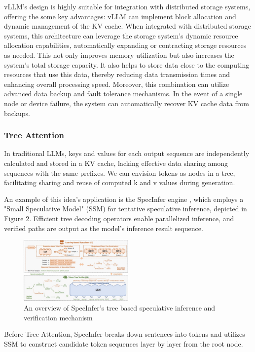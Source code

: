 \documentclass[conference]{IEEEtran}
\begin{document}
vLLM's design is highly suitable for integration with distributed storage systems, offering the some key advantages: vLLM can implement block allocation and dynamic management of the KV cache. When integrated with distributed storage systems, this architecture can leverage the storage system's dynamic resource allocation capabilities, automatically expanding or contracting storage resources as needed. This not only improves memory utilization but also increases the system's total storage capacity. It also helps to store data close to the computing resources that use this data, thereby reducing data transmission times and enhancing overall processing speed. Moreover, this combination can utilize advanced data backup and fault tolerance mechanisms. In the event of a single node or device failure, the system can automatically recover KV cache data from backups.


\subsubsection{Tree Attention}
In traditional LLMs, keys and values for each output sequence are independently calculated and stored in a KV cache, lacking effective data sharing among sequences with the same prefixes. We can envision tokens as nodes in a tree, facilitating sharing and reuse of computed k and v values during generation.

An example of this idea's application is the SpecInfer engine \cite{b2}, which employs a "Small Speculative Model" (SSM) for tentative speculative inference, depicted in Figure 2. Efficient tree decoding operators enable parallelized inference, and verified paths are output as the model's inference result sequence.

\begin{figure}[htbp]
    \centerline{\includegraphics[width=0.5\textwidth]{process figM2.png}}
    \caption{An overview of SpecInfer's tree based speculative inference and verification mechanism \cite{b2}}
    \label{fig}
\end{figure}

Before Tree Attention, SpecInfer breaks down sentences into tokens and utilizes SSM to construct candidate token sequences layer by layer from the root node.
\end{document}
